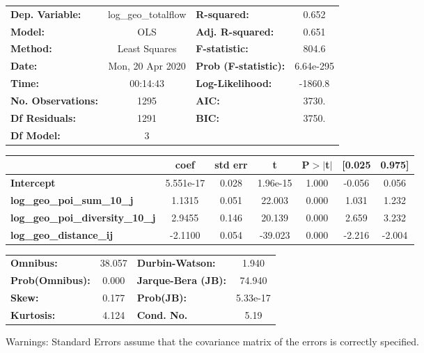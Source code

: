 \begin{center}
\begin{tabular}{lclc}
\toprule
\textbf{Dep. Variable:}                  & log\_geo\_totalflow & \textbf{  R-squared:         } &     0.652   \\
\textbf{Model:}                          &         OLS         & \textbf{  Adj. R-squared:    } &     0.651   \\
\textbf{Method:}                         &    Least Squares    & \textbf{  F-statistic:       } &     804.6   \\
\textbf{Date:}                           &   Mon, 20 Apr 2020  & \textbf{  Prob (F-statistic):} & 6.64e-295   \\
\textbf{Time:}                           &       00:14:43      & \textbf{  Log-Likelihood:    } &   -1860.8   \\
\textbf{No. Observations:}               &          1295       & \textbf{  AIC:               } &     3730.   \\
\textbf{Df Residuals:}                   &          1291       & \textbf{  BIC:               } &     3750.   \\
\textbf{Df Model:}                       &             3       & \textbf{                     } &             \\
\bottomrule
\end{tabular}
\begin{tabular}{lcccccc}
                                         & \textbf{coef} & \textbf{std err} & \textbf{t} & \textbf{P$> |$t$|$} & \textbf{[0.025} & \textbf{0.975]}  \\
\midrule
\textbf{Intercept}                       &    5.551e-17  &        0.028     &  1.96e-15  &         1.000        &       -0.056    &        0.056     \\
\textbf{log\_geo\_poi\_sum\_10\_j}       &       1.1315  &        0.051     &    22.003  &         0.000        &        1.031    &        1.232     \\
\textbf{log\_geo\_poi\_diversity\_10\_j} &       2.9455  &        0.146     &    20.139  &         0.000        &        2.659    &        3.232     \\
\textbf{log\_geo\_distance\_ij}          &      -2.1100  &        0.054     &   -39.023  &         0.000        &       -2.216    &       -2.004     \\
\bottomrule
\end{tabular}
\begin{tabular}{lclc}
\textbf{Omnibus:}       & 38.057 & \textbf{  Durbin-Watson:     } &    1.940  \\
\textbf{Prob(Omnibus):} &  0.000 & \textbf{  Jarque-Bera (JB):  } &   74.940  \\
\textbf{Skew:}          &  0.177 & \textbf{  Prob(JB):          } & 5.33e-17  \\
\textbf{Kurtosis:}      &  4.124 & \textbf{  Cond. No.          } &     5.19  \\
\bottomrule
\end{tabular}
\end{center}

Warnings: \newline
 [1] Standard Errors assume that the covariance matrix of the errors is correctly specified.